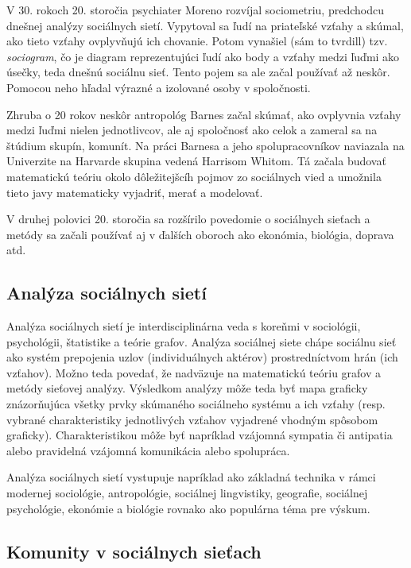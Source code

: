 \documentclass[slovak,master,public,dept460,male,cpdeclaration,oneside]{diploma}
\begin{document}
V 30. rokoch 20. storočia psychiater Moreno rozvíjal sociometriu, predchodcu dnešnej analýzy sociálnych sietí. Vypytoval sa ľudí na priateľské vzťahy a skúmal, ako tieto vzťahy ovplyvňujú ich chovanie. Potom vynašiel (sám to tvrdill) tzv. \textit{sociogram}, čo je diagram reprezentujúci ľudí ako body a vzťahy medzi ľuďmi ako úsečky, teda dnešnú sociálnu sieť. Tento pojem sa ale začal používať až neskôr. Pomocou neho hľadal výrazné a izolované osoby v spoločnosti.

Zhruba o 20 rokov neskôr antropológ Barnes začal skúmať, ako ovplyvnia vzťahy medzi ľuďmi nielen jednotlivcov, ale aj spoločnosť ako celok a zameral sa na štúdium skupín, komunít. Na práci Barnesa a jeho spolupracovníkov naviazala na Univerzite na Harvarde skupina vedená Harrisom Whitom. Tá začala budovať matematickú teóriu okolo dôležitejšcíh pojmov zo sociálnych vied a umožnila tieto javy matematicky vyjadriť, merať a modelovať.

V druhej polovici 20. storočia sa rozšírilo povedomie o sociálnych sieťach a metódy sa začali používať aj v ďalších oboroch ako ekonómia, biológia, doprava atd.

\subsection{Analýza sociálnych sietí}

Analýza sociálnych sietí je interdisciplinárna veda s koreňmi v sociológii, psychológii,
štatistike a teórie grafov. Analýza sociálnej siete chápe sociálnu sieť ako systém prepojenia uzlov (individuálnych aktérov) prostredníctvom hrán (ich vzťahov). Možno teda povedať, že nadväzuje na matematickú teóriu grafov a metódy sieťovej analýzy. Výsledkom analýzy môže teda byť mapa graficky znázorňujúca všetky prvky skúmaného sociálneho systému a ich vzťahy (resp. vybrané charakteristiky jednotlivých vzťahov vyjadrené vhodným spôsobom graficky). Charakteristikou môže byť napríklad vzájomná sympatia či antipatia alebo pravidelná vzájomná komunikácia alebo spolupráca.


Analýza sociálnych sietí vystupuje napríklad ako základná technika v rámci modernej sociológie,
antropológie, sociálnej lingvistiky, geografie, sociálnej psychológie, ekonómie a biológie
rovnako ako populárna téma pre výskum. 

\subsection{Komunity v sociálnych sieťach}
\end{document}
